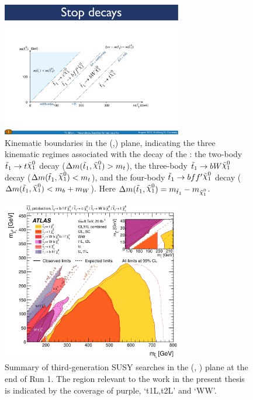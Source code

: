 \begin{figure}[!htb]
    \begin{center}
        \includegraphics[width=0.7\textwidth]{figures/search_stop2l/signal/stop_LSP_boundaries}
        \caption{
            Kinematic boundaries in the (\stopone,\ninoone) plane, indicating the three kinematic
            regimes associated with the decay of the \stopone: the two-body $\stopone \rightarrow t \ninoone$
            decay ($\Delta m(\stopone, \ninoone) > m_t$), the three-body $\stopone \rightarrow b W \ninoone$ decay
            ($\Delta m(\stopone, \ninoone) < m_t$), and the four-body $\stopone \rightarrow b f f^{\prime} \ninoone$
            decay ($\Delta m(\stopone, \ninoone) < m_b + m_W$).
            Here $\Delta m(\stopone, \ninoone) = m_{\stopone} - m_{\ninoone}$.
        }
        \label{fig:stop_boundaries}
    \end{center}
\end{figure}

\begin{figure}[!htb]
    \begin{center}
        \includegraphics[width=0.7\textwidth]{figures/search_stop2l/run1_stop_summary}
        \caption{
            Summary of third-generation SUSY searches in the (\stopone, \ninoone) plane
            at the end of Run 1.
            The region relevant to the work in the present thesis is indicated by the 
            coverage of purple, `t1L,t2L' and `WW'.
        }
        \label{fig:run1_stop_summary}
    \end{center}
\end{figure}

